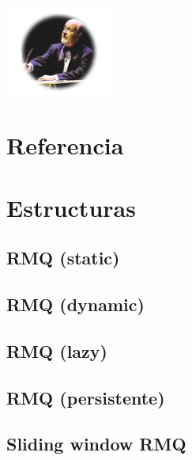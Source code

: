 

\def\title{El Mastro - Mastropiero Limit Exceeded - UNS}

\begin{center}{\includegraphics[width=3.5cm]{../misc/mastro}}\end{center}

\tableofcontents\newpage
 
\section{Referencia}%


\section{Estructuras}%
\subsection{RMQ (static)}
\subsection{RMQ (dynamic)}
\subsection{RMQ (lazy)}
\subsection{RMQ (persistente)}
\subsection{Sliding window RMQ}
